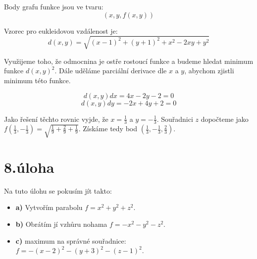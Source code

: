 \documentclass[a4paper, 11pt]{article}
\begin{document}
  Body grafu funkce jsou ve tvaru:
  $$(x,y,f(x,y))$$
  
  Vzorec pro eukleidovou vzdálenost je:
  $$d(x,y) = \sqrt{(x-1)^2+(y+1)^2+x^2-2xy+y^2}$$
  
  Využijeme toho, že odmocnina je ostře rostoucí funkce a budeme hledat minimum funkce $d(x,y)^2$. 
  Dále uděláme parciální derivace dle $x$ a $y$, abychom zjistli minimum této funkce.
  
  $$d(x,y)dx = 4x-2y-2 = 0$$
  $$d(x,y)dy = -2x+4y+2 = 0$$
  
  Jako řešení těchto rovnic vyjde, že $x = \frac{1}{3}$ a $y = -\frac{1}{3}$.
  Souřadnici $z$ dopočteme jako $f(\frac{1}{3},-\frac{1}{3}) = \sqrt{\frac{1}{9}+\frac{2}{9}+\frac{1}{9}}$. Získáme tedy bod $(\frac{1}{3},-\frac{1}{3},\frac{2}{3})$.
  
  
 \section*{8.úloha}
   Na tuto úlohu se pokusím jít takto:
   \begin{itemize}
    \item \textbf{a)} Vytvořím parabolu $f =x^2+y^2+z^2$.
    \item \textbf{b)} Obrátím jí vzhůru nohama $f = -x^2 - y^2 -z^2$.
    \item \textbf{c)}  maximum na správné souřadnice: $f = -(x-2)^2 - (y+3)^2 - (z-1)^2$.
   \end{itemize}
\end{document}
